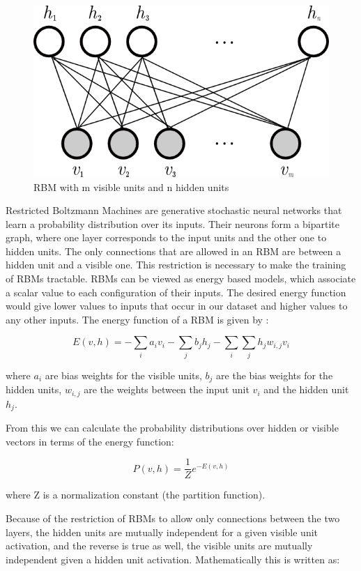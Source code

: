 \begin{figure}[h]
\begin{center}
\includegraphics[width=0.7\columnwidth]{img/rbm_graph.png}
\caption{
\label{fig:rbm_graph}
RBM with m visible units and n hidden units \cite{rbm_graph}
}
\end{center}
\end{figure}

Restricted Boltzmann Machines are generative stochastic neural networks that learn a probability distribution over its inputs. Their neurons form a bipartite graph, where one layer corresponds to the input units and the other one to hidden units. The only connections that are allowed in an RBM are between a hidden unit and a visible one. This restriction is necessary to make the training of RBMs tractable. RBMs can be viewed as energy based models, which associate a scalar value to each configuration of their inputs. The desired energy function would give lower values to inputs that occur in our dataset and higher values to any other inputs. The energy function of a RBM is given by \cite{hinton2010practical}:

\[ 
	E(v,h) = -\sum_i a_i v_i - \sum_j b_j h_j -\sum_i \sum_j h_j w_{i,j} v_i	
\]

where $ a_i $ are bias weights for the visible units, $ b_j $ are the bias weights for the hidden units, $ w_{i,j} $ are the weights between the input unit $v_i$ and the hidden unit $h_j $. 

From this we can calculate the probability distributions over hidden or visible vectors in terms of the energy function:

\[
	P(v,h) = \frac{1}{Z} e^{-E(v,h)}
\]

where Z is a normalization constant (the partition function). 

Because of the restriction of RBMs to allow only connections between the two layers, the hidden units are mutually independent for a given visible unit activation, and the reverse is true as well, the visible units are mutually independent given a hidden unit activation. Mathematically this is written as:

